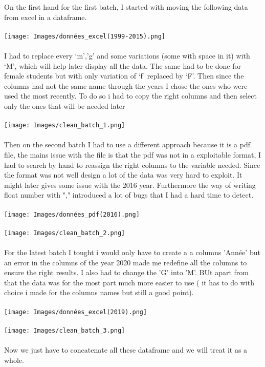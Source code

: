 \documentclass[
	12pt, %
]{fphw_assignment_toc}
\begin{document}
On the first hand for the first batch, I started with moving the following data from excel in a dataframe.
\\
\bigskip
\\
\texttt{[image: Images/données\_excel(1999-2015).png]}
\\
\bigskip
\\
\newpage
I had to replace every ‘m’,’g’ and some variations (some with space in it) with ‘M’, which will help later display all the data. The same had to be done for female students but with only variation of ‘f’ replaced by ‘F’. Then since the columns had not the same name through the years I chose the  ones who were used the most recently.
To do so i had to copy the right columns and then select only the ones that will be needed later
\\
\bigskip
\\
\texttt{[image: Images/clean\_batch\_1.png]}
\\
\bigskip
\\
Then on the second batch I had to use a different approach because it is a pdf file, the mains issue with the file is that the pdf was not in a exploitable format, I had to search by hand to reassign the right columns to the variable needed. Since the format was not well design a lot of the data was very hard to exploit. It might later gives some issue with the 2016 year. Furthermore the way of writing float number with "," introduced a lot of bugs that I had a hard time to detect.
\\
\bigskip
\\
\texttt{[image: Images/données\_pdf(2016).png]}
\\
\bigskip
\\
\texttt{[image: Images/clean\_batch\_2.png]}
\\
\bigskip
\\
\newpage
For the latest batch I tought i would only have to create a a columns 'Année' but an error in the columns of the year 2020 made me redefine all the columns to ensure the right results. I also had to change the 'G' into 'M'. BUt apart from that the data was for the most part much more easier to use ( it has to do with choice i made for the columns names but still a good point).
\\
\bigskip
\\
\texttt{[image: Images/données\_excel(2019).png]}
\\
\bigskip
\\
\texttt{[image: Images/clean\_batch\_3.png]}
\\
\bigskip
\\
Now we just have to concatenate all these dataframe and we will treat it as a whole.
\end{document}
